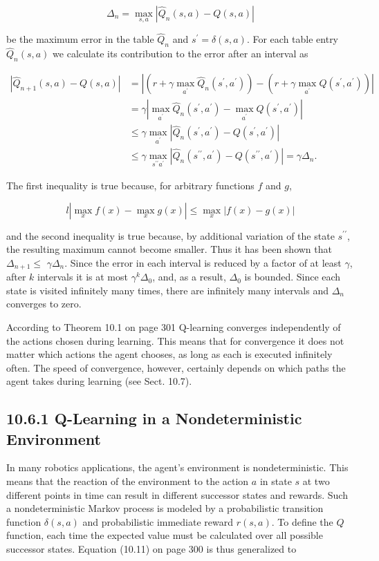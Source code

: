 \documentclass[10pt]{article}
\begin{document}
$$
\Delta_{n}=\max _{s, a}\left|\hat{Q}_{n}(s, a)-Q(s, a)\right|
$$

be the maximum error in the table $\hat{Q}_{n}$ and $s^{\prime}=\delta(s, a)$. For each table entry $\hat{Q}_{n}(s, a)$ we calculate its contribution to the error after an interval as

$$
\begin{aligned}
\left|\hat{Q}_{n+1}(s, a)-Q(s, a)\right| & =\left|\left(r+\gamma \max _{a^{\prime}} \hat{Q}_{n}\left(s^{\prime}, a^{\prime}\right)\right)-\left(r+\gamma \max _{a^{\prime}} Q\left(s^{\prime}, a^{\prime}\right)\right)\right| \\
& =\gamma\left|\max _{a^{\prime}} \hat{Q}_{n}\left(s^{\prime}, a^{\prime}\right)-\max _{a^{\prime}} Q\left(s^{\prime}, a^{\prime}\right)\right| \\
& \leq \gamma \max _{a^{\prime}}\left|\hat{Q}_{n}\left(s^{\prime}, a^{\prime}\right)-Q\left(s^{\prime}, a^{\prime}\right)\right| \\
& \leq \gamma \max _{s^{\prime \prime} a^{\prime}}\left|\hat{Q}_{n}\left(s^{\prime \prime}, a^{\prime}\right)-Q\left(s^{\prime \prime}, a^{\prime}\right)\right|=\gamma \Delta_{n} .
\end{aligned}
$$

The first inequality is true because, for arbitrary functions $f$ and $g$,

$$
l\left|\max _{x} f(x)-\max _{x} g(x)\right| \leq \max _{x}|f(x)-g(x)|
$$

and the second inequality is true because, by additional variation of the state $s^{\prime \prime}$, the resulting maximum cannot become smaller. Thus it has been shown that $\Delta_{n+1} \leq$ $\gamma \Delta_{n}$. Since the error in each interval is reduced by a factor of at least $\gamma$, after $k$ intervals it is at most $\gamma^{k} \Delta_{0}$, and, as a result, $\Delta_{0}$ is bounded. Since each state is visited infinitely many times, there are infinitely many intervals and $\Delta_{n}$ converges to zero.

According to Theorem 10.1 on page 301 Q-learning converges independently of the actions chosen during learning. This means that for convergence it does not matter which actions the agent chooses, as long as each is executed infinitely often. The speed of convergence, however, certainly depends on which paths the agent takes during learning (see Sect. 10.7).

\subsection*{10.6.1 Q-Learning in a Nondeterministic Environment}
In many robotics applications, the agent's environment is nondeterministic. This means that the reaction of the environment to the action $a$ in state $s$ at two different points in time can result in different successor states and rewards. Such a nondeterministic Markov process is modeled by a probabilistic transition function $\delta(s, a)$ and probabilistic immediate reward $r(s, a)$. To define the $Q$ function, each time the expected value must be calculated over all possible successor states. Equation (10.11) on page 300 is thus generalized to
\end{document}
